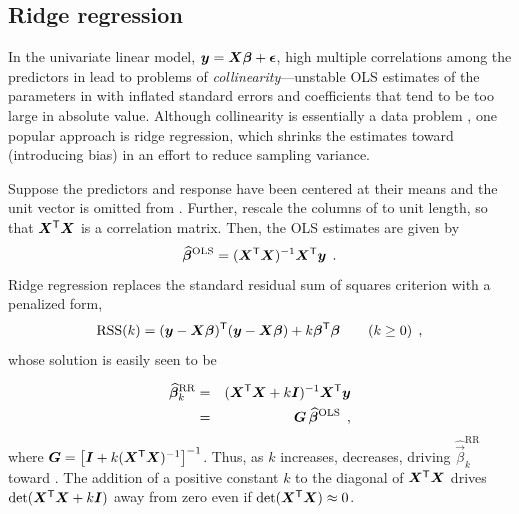 \subsection{Ridge regression}

In the univariate linear model, $\bm{y} = \bm{X} \bm{\beta} + \bm{\epsilon}$,
high multiple correlations among the predictors in  lead to problems
of \emph{collinearity}---unstable OLS
estimates of the parameters in \vec{\beta} with inflated standard errors
and coefficients that tend to be too large in absolute value.
Although collinearity is essentially a data problem
\citep{Fox:2008},
one popular approach is ridge regression, which shrinks the estimates toward
 (introducing bias) in an effort to reduce sampling variance.


Suppose the predictors and response have been centered at their means and the unit vector is
omitted from . Further, rescale the columns of  to unit length, so that $\bm{X}^\mathsf{T} \bm{X}$ is a correlation matrix.
Then, the OLS estimates are given by
\begin{equation}
\widehat{\bm{\beta}}^{\mathrm{OLS}} = (\bm{X}^\mathsf{T} \bm{X})^{-1} \bm{X}^\mathsf{T} \bm{y} \:\: .
\end{equation}
Ridge regression replaces the standard residual sum of squares criterion with a penalized
form,
\begin{equation}
\mathrm{RSS}(k) = (\bm{y}-\bm{X} \bm{\beta}) ^\mathsf{T}  (\bm{y}-\bm{X} \bm{\beta}) + k \bm{\beta}^\mathsf{T}\bm{\beta} \quad\quad (k \ge 0)
 \:\: , \label{eq:ridgeRSS}
\end{equation}
whose solution is easily seen to be

\begin{eqnarray}
\widehat{\bm{\beta}}^{\mathrm{RR}}_k  & = &(\bm{X}^\mathsf{T} \bm{X} + k \bm{I})^{-1} \bm{X}^\mathsf{T} \bm{y}  \label{eq:ridge-beta} \\
                                    & = & \bm{G} \, \widehat{\bm{\beta}}^{\mathrm{OLS}}  \nonumber \:\: ,
\end{eqnarray}
where $\bm{G} = \left[\bm{I} + k (\bm{X}^\mathsf{T} \bm{X})^{-1} \right] ^{-1}$.
Thus, as $k$ increases,  decreases, driving $\widehat{\vec{\beta}}^{\mathrm{RR}}_k$ toward 
\citep{HoerlKennard:1970a,HoerlKennard:1970b}.  The addition of a positive constant $k$ to the diagonal of $\bm{X}^\mathsf{T}\bm{X}$
drives $\mathrm{det} (\bm{X}^\mathsf{T}\bm{X}+ k \bm{I})$ away from zero even if $\mathrm{det} (\bm{X}^\mathsf{T}\bm{X})\approx 0$.

